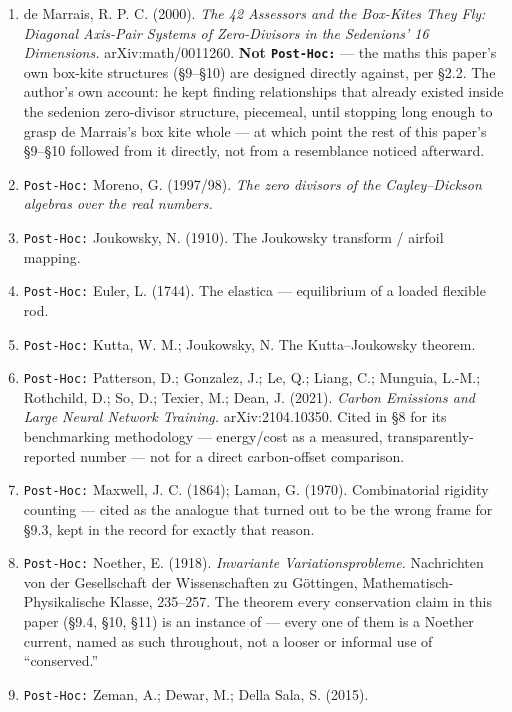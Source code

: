 \documentclass[
  10pt,
]{article}
\providecommand{\tightlist}{%
  \setlength{\itemsep}{0pt}\setlength{\parskip}{0pt}}
\begin{document}
\begin{enumerate}
\def\labelenumi{\arabic{enumi}.}
\tightlist
\item
  de Marrais, R. P. C. (2000). \emph{The 42 Assessors and the Box-Kites
  They Fly: Diagonal Axis-Pair Systems of Zero-Divisors in the
  Sedenions' 16 Dimensions.} arXiv:math/0011260. \textbf{Not
  \texttt{Post-Hoc:}} --- the maths this paper's own box-kite structures
  (§9--§10) are designed directly against, per §2.2. The author's own
  account: he kept finding relationships that already existed inside the
  sedenion zero-divisor structure, piecemeal, until stopping long enough
  to grasp de Marrais's box kite whole --- at which point the rest of
  this paper's §9--§10 followed from it directly, not from a resemblance
  noticed afterward.
\item
  \texttt{Post-Hoc:} Moreno, G. (1997/98). \emph{The zero divisors of
  the Cayley--Dickson algebras over the real numbers.}
\item
  \texttt{Post-Hoc:} Joukowsky, N. (1910). The Joukowsky transform /
  airfoil mapping.
\item
  \texttt{Post-Hoc:} Euler, L. (1744). The elastica --- equilibrium of a
  loaded flexible rod.
\item
  \texttt{Post-Hoc:} Kutta, W. M.; Joukowsky, N. The Kutta--Joukowsky
  theorem.
\item
  \texttt{Post-Hoc:} Patterson, D.; Gonzalez, J.; Le, Q.; Liang, C.;
  Munguia, L.-M.; Rothchild, D.; So, D.; Texier, M.; Dean, J. (2021).
  \emph{Carbon Emissions and Large Neural Network Training.}
  arXiv:2104.10350. Cited in §8 for its benchmarking methodology ---
  energy/cost as a measured, transparently-reported number --- not for a
  direct carbon-offset comparison.
\item
  \texttt{Post-Hoc:} Maxwell, J. C. (1864); Laman, G. (1970).
  Combinatorial rigidity counting --- cited as the analogue that turned
  out to be the wrong frame for §9.3, kept in the record for exactly
  that reason.
\item
  \texttt{Post-Hoc:} Noether, E. (1918). \emph{Invariante
  Variationsprobleme.} Nachrichten von der Gesellschaft der
  Wissenschaften zu Göttingen, Mathematisch-Physikalische Klasse,
  235--257. The theorem every conservation claim in this paper (§9.4,
  §10, §11) is an instance of --- every one of them is a Noether
  current, named as such throughout, not a looser or informal use of
  ``conserved.''
\item
  \texttt{Post-Hoc:} Zeman, A.; Dewar, M.; Della Sala, S. (2015).

\end{enumerate}
\end{document}
